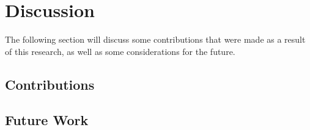 \documentclass[journal]{IEEEtran}
\begin{document}
\section{Discussion}
The following section will discuss some contributions that were made as a result of this research, as well as some considerations for the future.
 \subsection{Contributions}
 
 
 \subsection{Future Work}


%
%



%
%
\end{document}
